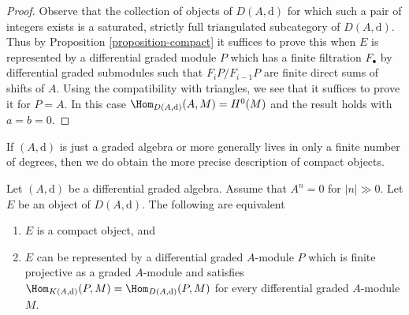 \begin{proof}
Observe that the collection of objects of $D(A, \text{d})$ for which
such a pair of integers exists is a saturated, strictly full triangulated
subcategory of $D(A, \text{d})$.
Thus by Proposition \ref{proposition-compact} it suffices to prove
this when $E$ is represented by a differential graded module $P$ which
has a finite filtration $F_\bullet$ by differential graded submodules
such that $F_iP/F_{i - 1}P$ are finite direct sums of shifts of $A$.
Using the compatibility with triangles, we see that it suffices
to prove it for $P = A$. In this case $\Hom_{D(A, \text{d})}(A, M) = H^0(M)$
and the result holds with $a = b = 0$.
\end{proof}

\noindent
If $(A, \text{d})$ is just a graded algebra or more generally lives in
only a finite number of degrees, then we do obtain the
more precise description of compact objects.

\begin{lemma}
\label{lemma-compact}
Let $(A, \text{d})$ be a differential graded algebra. Assume that $A^n = 0$
for $|n| \gg 0$. Let $E$ be an object of $D(A, \text{d})$.
The following are equivalent
\begin{enumerate}
\item $E$ is a compact object, and
\item $E$ can be represented by a differential graded $A$-module $P$
which is finite projective as a graded $A$-module and satisfies
$\Hom_{K(A, \text{d})}(P, M) = \Hom_{D(A, \text{d})}(P, M)$
for every differential graded $A$-module $M$.
\end{enumerate}
\end{lemma}


